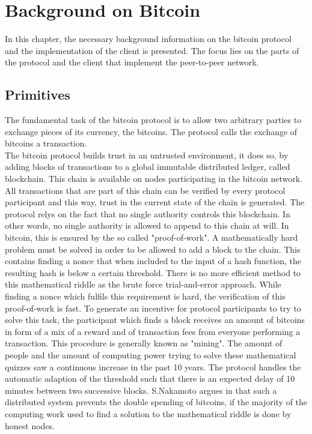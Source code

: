 \chapter{\label{background}Background on Bitcoin}
In this chapter, the necessary background information on the bitcoin protocol and the implementation of the client is presented. The focus lies on the parts of the protocol and the client that implement the peer-to-peer network.



\section{Primitives}
The fundamental task of the bitcoin protocol is to allow two arbitrary parties to exchange pieces of its currency, the bitcoins. The protocol calls the exchange of bitcoins a transaction.\\
The bitcoin protocol builds trust in an untrusted environment, it does so, by adding blocks of transactions to a global immutable distributed ledger, called blockchain. This chain is available on nodes participating in the bitcoin network. All transactions that are part of this chain can be verified by every protocol participant and this way, trust in the current state of the chain is generated. The protocol relys on the fact that no single authority controls this blockchain. In other words, no single authority is allowed to append to this chain at will. In bitcoin, this is ensured by the so called "proof-of-work". A mathematically hard problem must be solved in order to be allowed to add a block to the chain. This contains finding a nonce that when included to the input of a hash function, the resulting hash is below a certain threshold. There is no more efficient method to this mathematical riddle as the brute force trial-and-error approach. While finding a nonce which fulfils this requirement is hard, the verification of this proof-of-work is fast.  To generate an incentive for protocol participants to try to solve this task, the participant which finds a block receives an amount of bitcoins in form of a mix of a reward and of transaction fees from everyone performing a transaction. This procedure is generally known as "mining". The amount of people and the amount of computing power trying to solve these mathematical quizzes saw a continuous increase in the past 10 years. The protocol handles the automatic adaption of the threshold such that there is an expected delay of 10 minutes between two successive blocks. S.Nakamoto argues in \cite{nakamoto2008bitcoin} that such a distributed system prevents the double spending of bitcoins, if the majority of the computing work used to find a solution to the mathematical riddle is done by honest nodes.



